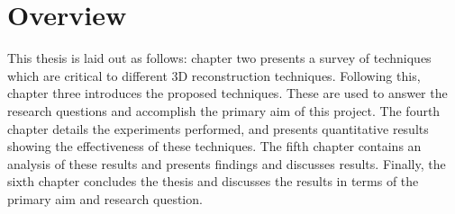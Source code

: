 \section{Overview}

This thesis is laid out as follows: chapter two presents a survey of techniques which are critical to different 3D reconstruction techniques. Following this, chapter three introduces the proposed techniques. These are used to answer the research questions and accomplish the primary aim of this project. The fourth chapter details the experiments performed, and presents quantitative results showing the effectiveness of these techniques. The fifth chapter contains an analysis of these results and presents findings and discusses results. Finally, the sixth chapter concludes the thesis and discusses the results in terms of the primary aim and research question. 


